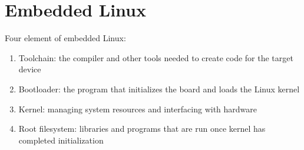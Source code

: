 \documentclass[12pt,a4paper]{article}
\begin{document}
\section{Embedded Linux}
Four element of embedded Linux:
\begin{enumerate}
	\item Toolchain: the compiler and other tools needed to create code for the target device
	\item Bootloader: the program that initializes the board and loads the Linux kernel
	\item Kernel: managing system resources and interfacing with hardware
	\item Root filesystem: libraries and programs that are run once kernel has completed initialization
\end{enumerate}
\end{document}
